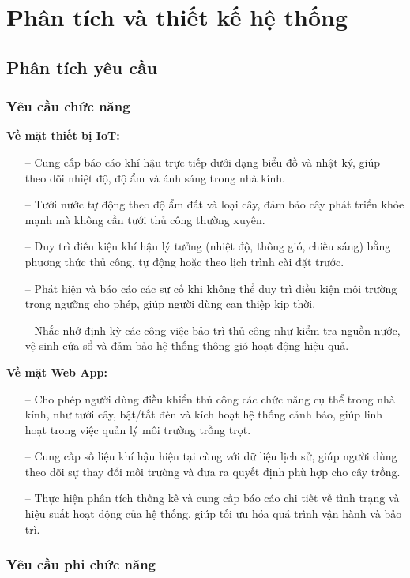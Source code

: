 \section{Phân tích và thiết kế hệ thống}
\subsection{Phân tích yêu cầu}
\subsubsection{Yêu cầu chức năng}

\textbf{Về mặt thiết bị IoT:}
\begin{itemize}
    \item [--] Cung cấp báo cáo khí hậu trực tiếp dưới dạng biểu đồ và nhật ký, giúp theo dõi nhiệt độ, độ ẩm và ánh sáng trong nhà kính.  
    \item [--] Tưới nước tự động theo độ ẩm đất và loại cây, đảm bảo cây phát triển khỏe mạnh mà không cần tưới thủ công thường xuyên.  
    \item [--] Duy trì điều kiện khí hậu lý tưởng (nhiệt độ, thông gió, chiếu sáng) bằng phương thức thủ công, tự động hoặc theo lịch trình cài đặt trước.  
    \item [--] Phát hiện và báo cáo các sự cố khi không thể duy trì điều kiện môi trường trong ngưỡng cho phép, giúp người dùng can thiệp kịp thời.  
    \item [--] Nhắc nhở định kỳ các công việc bảo trì thủ công như kiểm tra nguồn nước, vệ sinh cửa sổ và đảm bảo hệ thống thông gió hoạt động hiệu quả.
\end{itemize}

\textbf{Về mặt Web App:}
\begin{itemize}
    \item [--] Cho phép người dùng điều khiển thủ công các chức năng cụ thể trong nhà kính, như tưới cây, bật/tắt đèn và kích hoạt hệ thống cảnh báo, giúp linh hoạt trong việc quản lý môi trường trồng trọt.
    \item [--] Cung cấp số liệu khí hậu hiện tại cùng với dữ liệu lịch sử, giúp người dùng theo dõi sự thay đổi môi trường và đưa ra quyết định phù hợp cho cây trồng.
    \item [--] Thực hiện phân tích thống kê và cung cấp báo cáo chi tiết về tình trạng và hiệu suất hoạt động của hệ thống, giúp tối ưu hóa quá trình vận hành và bảo trì. 
\end{itemize}

\subsubsection{Yêu cầu phi chức năng}

